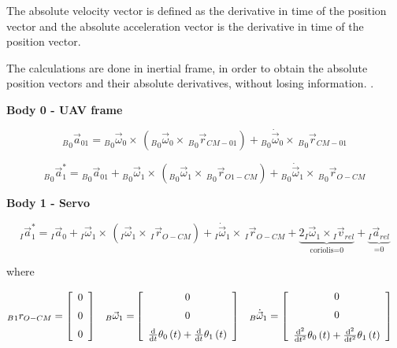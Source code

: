 The absolute velocity vector is defined as the derivative in time of the position vector and the absolute acceleration vector is the derivative in time of the position vector.

The calculations are done in inertial frame, in order to obtain the absolute position vectors and their absolute  derivatives, without losing information. \cite{santos2001dinamica}.

\textbf{Body 0 - UAV frame}

\begin{equation}\label{aabody0}
{_B}_{0}\vec{a}_{01} = {_B}_{0}\vec{\omega}_{0}\times \,({_B}_{0}\vec{\omega}_{0}\times \,{_B}_{0}\vec{r}_{CM-01}) + {_B}_{0}\dot{\vec{\omega}}_{0}\times \,{_B}_{0}\vec{r}_{CM-01}
\end{equation}

\begin{equation}\label{aabody01}
{_B}_{0}\vec{a}_{1}^* = {_B}_{0}\vec{a}_{01}+ {_B}_{0}\vec{\omega}_{1}\times \,({_B}_{0}\vec{\omega}_{1}\times \,{_B}_{0}\vec{r}_{O1-CM}) + {_B}_{0}\dot{\vec{\omega}}_{1}\times \,{_B}_{0}\vec{r}_{O-CM}
\end{equation}

\textbf{Body 1 - Servo}

\begin{equation}\label{aabody1}
_I\vec{a}_{1}^* = {_I}\vec{a}_{0}+ {_I}\vec{\omega}_{1}\times \,({_I}\vec{\omega}_{1}\times \,{_I}\vec{r}_{O-CM}) + {_I}\dot{\vec{\omega}}_{1}\times \,{_I}\vec{r}_{O-CM} + \underbrace{2{_I}\vec{\omega}_{1} \times {_I}\vec{v}_{rel}}_\text{coriolis=0} +  \underbrace{{_I}\vec{a}_{rel}}_\text{=0}
\end{equation}

 where 
 
 \begin{align*}
_B{_1}{r}_{O-CM} &= \left[ \begin {array}{c} 0\\ \noalign{\medskip}0\\ \noalign{\medskip}0
\end {array} \right] &
{_B}\vec{\omega}_{1} =&   \left[ \begin {array}{c} 0\\ \noalign{\medskip}0\\ \noalign{\medskip}
{\frac {\rm d}{{\rm d}t}}\theta_{{0}} \left( t \right) +{\frac {\rm d}
{{\rm d}t}}\theta_{{1}} \left( t \right) \end {array} \right] 
&
{_B}\dot{\vec{\omega}}_{1} &=  \left[ \begin {array}{c} 0\\ \noalign{\medskip}0\\ \noalign{\medskip}
{\frac {{\rm d}^{2}}{{\rm d}{t}^{2}}}\theta_{{0}} \left( t \right) +{
\frac {{\rm d}^{2}}{{\rm d}{t}^{2}}}\theta_{{1}} \left( t \right) 
\end {array} \right] 
 &
\end{align*}
 

